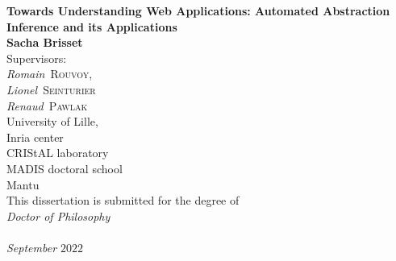 \begin{titlepage}
\begin{center}

{\LARGE {\bf 
Towards Understanding Web Applications: Automated Abstraction Inference and its Applications
}}
\\[2cm]
{\large{ \bf {Sacha Brisset}}}
\\[1cm]

Supervisors: \\[0.35cm]
\emph{Romain}~\textsc{Rouvoy}, \\
\emph{Lionel}~\textsc{Seinturier}\\
\emph{Renaud}~\textsc{Pawlak}
\\[2cm]
{\large University of Lille, \\
Inria center \\
CRIStAL laboratory \\
MADIS doctoral school \\
Mantu
}
\\[1cm]
This dissertation is submitted for the degree of \\ \textit{Doctor of Philosophy}
\\[2cm]
\\[2cm]

\textit{September $2022$}

\end{center}
\end{titlepage}

